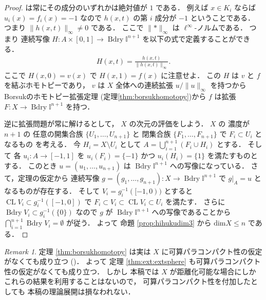 \documentclass[leqno, a4paper, 12pt]{jsarticle}
\theoremstyle{plain}
\theoremstyle{definition}
\theoremstyle{remark}
\newtheorem{rmk}{Remark}[section]
\DeclareMathOperator{\bd}{\mathrm{Bdry}}
\DeclareMathOperator{\cl}{\mathrm{CL}}
\newcommand{\yodim}{\mathrm{dim}}
\newcommand{\yospfont}[1]{\mathbb{#1}}
\newcommand{\yocubebd}[1]{\bd\yospfont{I}^{#1}}
\numberwithin{equation}{section}
\begin{document}
\begin{proof}
は常にその成分のいずれかは絶対値が
$1$
である．
例えば
$x\in K_{i}$
ならば
$u_{i}(x)=f_{i}(x)=-1$
なので
$h(x, t)$
の第
$i$
成分が
$-1$
ということである．
つまり
$\lVert h(x, t)\lVert_{\infty}\neq 0$
である．
ここで
$\lVert*\rVert_{\infty}$
は
$\ell^{\infty}$-ノルムである．
つまり
連続写像
$H\colon A\times [0, 1]\to \yocubebd{n+1}$
を以下の式で定義することができる．
\begin{align}
H(x, t)=\frac{h(x, t)}{\lVert h(x, t)\lVert_{\infty}}. 
\end{align}
ここで
$H(x, 0)=v(x)$
で
$H(x, 1)=f(x)$
に注意せよ．
この
$H$
は
$v$
と
$f$
を結ぶホモトピーであり，
$v$
は
$X$
全体への連続拡張
$u/\lVert u\rVert_{\infty}$
を持つから
Borsukのホモトピー拡張定理
(定理\ref{thm:borsukhomotopy})から
$f$
は拡張
$F\colon X\to \yocubebd{n+1}$
を持つ．

逆に拡張問題が常に解けるとして，
$X$
の次元の評価をしよう．
$X$
の
濃度が
$n+1$
の
任意の開集合族
$\{U_{1}, \dots, U_{n+1}\}$
と
閉集合族
$\{F_{1}, \dots, F_{n+1}\}$
で
$F_{i}\subset U_{i}$
となるもの
を考える．
今
$H_{i}=X\setminus U_{i}$
として
$A=\bigcup_{i=1}^{n+1}(F_{i}\cup H_{i})$
とする．
そして
各
$u_{i}\colon A\to [-1, 1]$
を
$u_{i}(F_{i})=\{-1\}$
かつ
$u_{i}(H_{i})=\{1\}$
を満たすものとする．
このとき
$u=(u_{1}, \dots, u_{n+1})$
は
$\yocubebd{n+1}$
への写像になっている．
さて，定理の仮定から
連続写像
$g=(g_{1}, \dots,  g_{n+1})\colon X\to \yocubebd{n+1}$
で
$g|_{A}=u$
となるものが存在する．
そして
$V_{i}=g_{i}^{-1}([-1, 0))$
とすると
$\cl V_{i}\subset g_{i}^{-1}([-1, 0])$
で
$F_{i}\subset V_{i}\subset \cl V_{i}\subset U_{i}$
を満たす．
さらに
$\bd V_{i}\subset g_{i}^{-1}(\{0\})$
なので
$g$
が
$\yocubebd{n+1}$
への写像であることから
$\bigcap_{i=1}^{n+1}\bd V_{i}=\emptyset$
が従う．
よって
命題
\ref{prop:hihukudim3}
から
$\yodim X\le n$
である．
\end{proof}
\begin{rmk}
定理
\ref{thm:borsukhomotopy}
は実は
$X$
に可算パラコンパクト性の仮定がなくても成り立つ
(\cite{zbMATH03491867})．
よって
定理
\ref{thm:ext:extsphere}
も可算パラコンパクト性の仮定がなくても成り立つ．
しかし
本稿では
$X$
が距離化可能な場合にしか
これらの結果を利用することはないので，
可算パラコンパクト性を付加したとしても
本稿の理論展開は損なわれない．
\end{rmk}



\end{document}
